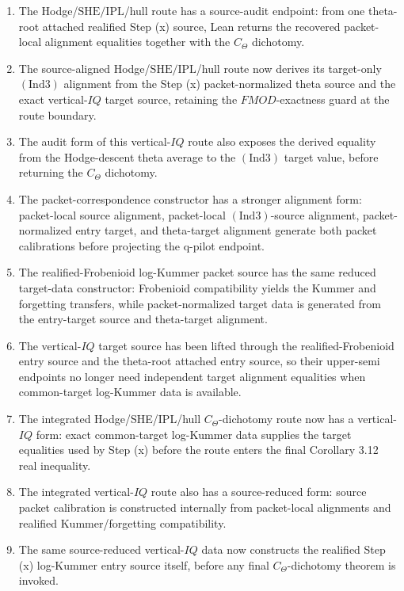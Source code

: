 \documentclass[11pt]{article}
\newcommand{\Lean}{Lean}
\newcommand{\Ind}{\ensuremath{\mathrm{Ind}}}
\newcommand{\SHE}{\ensuremath{\mathrm{SHE}}}
\newcommand{\IPL}{\ensuremath{\mathrm{IPL}}}
\theoremstyle{plain}
\theoremstyle{definition}
\theoremstyle{remark}
\begin{document}
\begin{enumerate}
  and nonzero full-label facts.
\item The Hodge/\(\SHE/\IPL\)/hull route has a source-audit endpoint: from one
  theta-root attached realified Step (x) source, \Lean{} returns the recovered
  packet-local alignment equalities together with the \(C_\Theta\) dichotomy.
\item The source-aligned Hodge/\(\SHE/\IPL\)/hull route now derives its
  target-only \((\Ind3)\) alignment from the Step (x) packet-normalized theta
  source and the exact vertical-\(IQ\) target source, retaining the
  \(FMOD\)-exactness guard at the route boundary.
\item The audit form of this vertical-\(IQ\) route also exposes the derived
  equality from the Hodge-descent theta average to the \((\Ind3)\) target
  value, before returning the \(C_\Theta\) dichotomy.
\item The packet-correspondence constructor has a stronger alignment form:
  packet-local source alignment, packet-local \((\Ind3)\)-source alignment,
  packet-normalized entry target, and theta-target alignment generate both
  packet calibrations before projecting the q-pilot endpoint.
\item The realified-Frobenioid log-Kummer packet source has the same reduced
  target-data constructor: Frobenioid compatibility yields the Kummer and
  forgetting transfers, while packet-normalized target data is generated from
  the entry-target source and theta-target alignment.
\item The vertical-\(IQ\) target source has been lifted through the
  realified-Frobenioid entry source and the theta-root attached entry source,
  so their upper-semi endpoints no longer need independent target alignment
  equalities when common-target log-Kummer data is available.
\item The integrated Hodge/SHE/IPL/hull \(C_\Theta\)-dichotomy route now has a
  vertical-\(IQ\) form: exact common-target log-Kummer data supplies the
  target equalities used by Step (x) before the route enters the final
  Corollary 3.12 real inequality.
\item The integrated vertical-\(IQ\) route also has a source-reduced form:
  source packet calibration is constructed internally from packet-local
  alignments and realified Kummer/forgetting compatibility.
\item The same source-reduced vertical-\(IQ\) data now constructs the
  realified Step (x) log-Kummer entry source itself, before any final
  \(C_\Theta\)-dichotomy theorem is invoked.

\end{enumerate}
\end{document}
